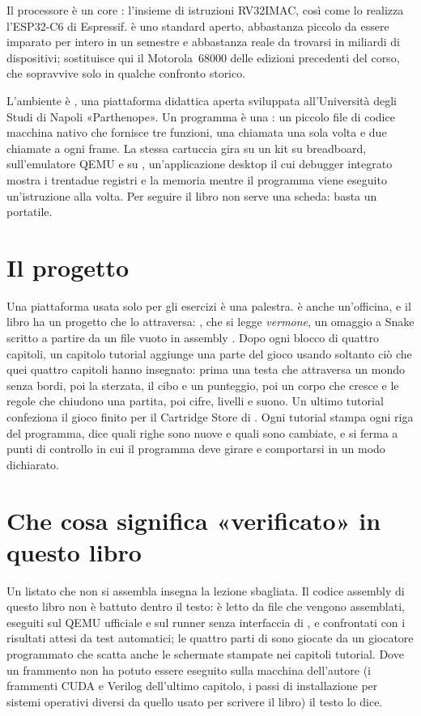 Il processore è un core \riscv: l'insieme di istruzioni RV32IMAC, così come lo
realizza l'ESP32\nobreakdash-C6 di Espressif. \riscv è uno standard aperto,
abbastanza piccolo da essere imparato per intero in un semestre e abbastanza
reale da trovarsi in miliardi di dispositivi; sostituisce qui il Motorola~68000
delle edizioni precedenti del corso, che sopravvive solo in qualche confronto
storico.

L'ambiente è \prg, una piattaforma didattica aperta sviluppata all'Università
degli Studi di Napoli «Parthenope». Un programma \prg è una :
un piccolo file di codice macchina nativo che fornisce tre funzioni, una
chiamata una sola volta e due chiamate a ogni frame. La stessa cartuccia gira
su un kit su breadboard, sull'emulatore QEMU e su \prgqt, un'applicazione
desktop il cui debugger integrato mostra i trentadue registri e la memoria
mentre il programma viene eseguito un'istruzione alla volta. Per seguire il
libro non serve una scheda: basta un portatile.

\section*{Il progetto}

Una piattaforma usata solo per gli esercizi è una palestra. \prg è anche
un'officina, e il libro ha un progetto che lo attraversa: \vermone, che si
legge \emph{vermone}, un omaggio a Snake scritto a partire da un file vuoto in
assembly \riscv. Dopo ogni blocco di quattro capitoli, un capitolo tutorial
aggiunge una parte del gioco usando soltanto ciò che quei quattro capitoli
hanno insegnato: prima una testa che attraversa un mondo senza bordi, poi la
sterzata, il cibo e un punteggio, poi un corpo che cresce e le regole che
chiudono una partita, poi cifre, livelli e suono. Un ultimo tutorial confeziona
il gioco finito per il Cartridge Store di \prg. Ogni tutorial stampa ogni riga
del programma, dice quali righe sono nuove e quali sono cambiate, e si ferma a
punti di controllo in cui il programma deve girare e comportarsi in un modo
dichiarato.

\section*{Che cosa significa «verificato» in questo libro}

Un listato che non si assembla insegna la lezione sbagliata. Il codice assembly
di questo libro non è battuto dentro il testo: è letto da file che vengono
assemblati, eseguiti sul QEMU ufficiale e sul runner senza interfaccia di
\prgqt, e confrontati con i risultati attesi da test automatici; le quattro
parti di \vermone sono giocate da un giocatore programmato che scatta anche le
schermate stampate nei capitoli tutorial. Dove un frammento non ha potuto
essere eseguito sulla macchina dell'autore (i frammenti CUDA e Verilog
dell'ultimo capitolo, i passi di installazione per sistemi operativi diversi da
quello usato per scrivere il libro) il testo lo dice.

